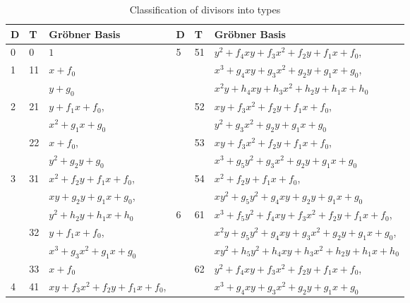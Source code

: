 \begin{table}[hb!]
\caption{Classification of divisors into types}
\label{tab_divisor_types}
\begin{center}
\begin{tabular}{l|l|l||l|l|l}
  D & T & Gr\"obner Basis & D & T & Gr\"obner Basis \\
  \hline
  0 & 0 & $1$ & \multirow{9}{*}{5} &\multirow{3}{*}{51} & $y^2 + f_4xy + f_3x^2 + f_2y + f_1x + f_0$, \\
  \cline{1-3}
  \multirow{2}{*}{1} &\multirow{2}{*}{11} & $x + f_0$ & & & $x^3 + g_4xy + g_3x^2 + g_2y + g_1x + g_0$, \\
    & & $y + g_0$ & & & $x^2y + h_4xy + h_3x^2 + h_2y + h_1x + h_0$ \\
  \cline{1-3}\cline{5-6}
  \multirow{4}{*}{2} &\multirow{2}{*}{21} & $y + f_1x + f_0$, & & \multirow{2}{*}{52} & $xy + f_3x^2 + f_2y + f_1x + f_0$, \\
    & & $x^2 + g_1x + g_0$ & & & $y^2 + g_3x^2 + g_2y + g_1x + g_0$ \\
    \cline{2-3}\cline{5-6}
    &\multirow{2}{*}{22}  & $x + f_0$, & & \multirow{2}{*}{53} & $xy + f_3x^2 + f_2y + f_1x + f_0$, \\
    & & $y^2 + g_2y + g_0$ & & & $x^3 + g_5y^2 + g_3x^2 + g_2y + g_1x + g_0$ \\
  \cline{1-3}\cline{5-6}
  \multirow{6}{*}{3} &\multirow{3}{*}{31} & $x^2 + f_2y + f_1x + f_0$, & & \multirow{2}{*}{54} & $x^2 + f_2y + f_1x + f_0$, \\
    & & $xy + g_2y + g_1x + g_0$, & & & $xy^2 + g_5y^2 + g_4xy + g_2y + g_1x + g_0$ \\
  \cline{4-6}
    & & $y^2 + h_2y + h_1x + h_0$ & \multirow{10}{*}{6} &\multirow{3}{*}{61} & $x^3 + f_5y^2 + f_4xy + f_3x^2 + f_2y + f_1x + f_0$, \\
    \cline{2-3}
    &\multirow{2}{*}{32} & $y + f_1x + f_0$, & & & $x^2y + g_5y^2 + g_4xy + g_3x^2 + g_2y + g_1x + g_0$, \\
    & & $x^3 + g_3x^2 + g_1x + g_0$ & & & $xy^2 + h_5y^2 + h_4xy + h_3x^2 + h_2y + h_1x + h_0$ \\
    \cline{2-3}\cline{5-6}
    &\multirow{1}{*}{33} & $x + f_0$ & &\multirow{2}{*}{62} & $y^2 + f_4xy + f_3x^2 + f_2y + f_1x + f_0$, \\
  \cline{1-3}
  \multirow{8}{*}{4} &\multirow{3}{*}{41} & $xy + f_3x^2 + f_2y + f_1x + f_0$, & & & $x^3 + g_4xy + g_3x^2 + g_2y + g_1x + g_0$ \\

\end{tabular}
\end{center}
\end{table}
